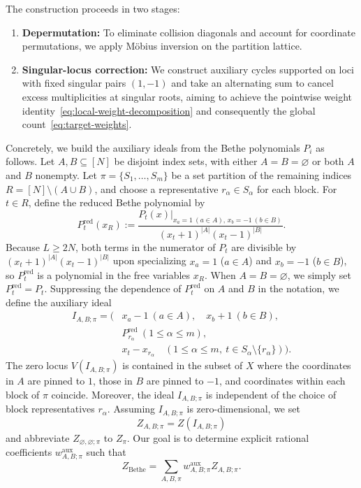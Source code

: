 \documentclass[11pt]{article}
\theoremstyle{definition}
\begin{document}
The construction proceeds in two stages:
\begin{enumerate}
	\item \textbf{Depermutation:} To eliminate collision diagonals and account for coordinate permutations, we apply M\"obius inversion on the partition lattice.
	\item \textbf{Singular-locus correction:} We construct auxiliary cycles supported on loci with fixed singular pairs $(1,-1)$ and take an alternating sum to cancel excess multiplicities at singular roots, aiming to achieve the pointwise weight identity~\eqref{eq:local-weight-decomposition} and consequently the global count~\eqref{eq:target-weights}.
\end{enumerate}

Concretely, we build the auxiliary ideals from the Bethe polynomials $P_i$ as follows. Let $A,B\subseteq[N]$ be disjoint index sets, with either $A=B=\varnothing$ or
both $A$ and $B$ nonempty. Let $\pi=\{S_1,\ldots,S_m\}$ be a set partition
of the remaining indices $R=[N]\setminus(A\cup B)$, and choose a representative $r_\alpha\in
S_\alpha$ for each block. For $t\in R$, define
the reduced Bethe polynomial by
\begin{equation}\label{eq:reduced-fixed-equation}
	P_t^{\mathrm{red}}(x_R)
	:=\frac{\left.P_t(x)\right|_{x_a=1\ (a\in A),\,
			x_b=-1\ (b\in B)}}{(x_t+1)^{|A|}(x_t-1)^{|B|}}.
\end{equation}
Because $L\ge 2N$, both terms in the numerator of $P_t$ are divisible
by $(x_t+1)^{|A|}(x_t-1)^{|B|}$ upon specializing $x_a=1$ ($a\in A$) and $x_b=-1$ ($b\in B$), so $P_t^{\mathrm{red}}$ is a polynomial in the free variables $x_R$.
When $A=B=\varnothing$, we simply set $P_t^{\mathrm{red}}=P_t$.
Suppressing the dependence of $P_t^{\mathrm{red}}$ on $A$ and $B$ in the notation, we define the auxiliary ideal
\begin{equation}\label{eq:fixed-partition-ideal}
	\begin{aligned}
		I_{A,B;\pi}=\bigl(&x_a-1\ (a\in A),\quad x_b+1\ (b\in B),\\
		&P_{r_\alpha}^{\mathrm{red}}\ (1\le\alpha\le m),\\
		&x_t-x_{r_\alpha}\quad
		(1\le\alpha\le m,\ t\in S_\alpha\setminus\{r_\alpha\})
		\bigr).
	\end{aligned}
\end{equation}
The zero locus $V(I_{A,B;\pi})$ is contained in the subset of $X$ where the coordinates in $A$ are pinned to $1$, those in $B$ are pinned to $-1$, and coordinates within each block of $\pi$ coincide. Moreover, the ideal $I_{A,B;\pi}$ is independent
of the choice of block representatives $r_\alpha$. Assuming $I_{A,B;\pi}$ is zero-dimensional, we set
\[
Z_{A,B;\pi}=Z(I_{A,B;\pi})
\]
and abbreviate $Z_{\varnothing,\varnothing;\pi}$ to $Z_\pi$.
Our goal is to determine explicit rational coefficients $w_{A,B;\pi}^{\mathrm{aux}}$ such that
\[
Z_{\mathrm{Bethe}}=\sum_{A,B,\pi}w_{A,B;\pi}^{\mathrm{aux}}Z_{A,B;\pi}.
\]
\end{document}
